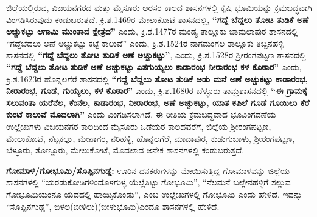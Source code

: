 ಜಿಲ್ಲೆಯಲ್ಲಿರುವ, ವಿಜಯನಗರದ ಮತ್ತು ಮೈಸೂರು ಅರಸರ ಕಾಲದ ಶಾಸನಗಳಲ್ಲಿ ಕೃಷಿ ಭೂಮಿಯನ್ನು ಕ್ರಮಬದ್ಧವಾಗಿ ವಿಂಗಡಿಸಿರುವುದು ಕಂಡುಬರುತ್ತದೆ. ಕ್ರಿ.ಶ.1469ರ ಮೇಲುಕೋಟೆ ಶಾಸನದಲ್ಲಿ, \textbf{“ಗದ್ದೆ ಬೆದ್ದಲು ತೋಟ ತುಡಿಕೆ ಅಣೆ ಅಚ್ಚುಕಟ್ಟು ಆಗಾಮಿ ಮುಂತಾದ ಕ್ಷೇತ್ರದ”} ಎಂದು, ಕ್ರಿ.ಶ.1477ರ ಮಂಡ್ಯ ತಾಲ್ಲೂಕು ಚಾಮಲಾಪುರ ಶಾಸನದಲ್ಲಿ “ಗದ್ದೆಬೆದಲು ಅಣೆ ಅಚ್ಚುಕಟ್ಟು ಕಟ್ಟೆ ಕಾಲುವೆ” ಎಂದು, ಕ್ರಿ.ಶ.1524ರ ನಾಗಮಂಗಲ ತಾಲ್ಲೂಕು ತಿಬ್ಬನಹಳ್ಳಿ ಶಾಸನದಲ್ಲಿ \textbf{“ಗದ್ದೆ ಬೆದ್ದಲು ತೋಟ ತುಡಿಕೆ ಅಣೆ ಅಚ್ಚುಕಟ್ಟು”}, ಎಂದು, ಕ್ರಿ.ಶ.1528ರ ಶ‍್ರೀರಂಗಪಟ್ಟಣ ಶಾಸನದಲ್ಲಿ \textbf{“ಗದ್ದೆ ಬೆದ್ದಲು ತೋಟ ತುಡಿಕೆ ಅಣೆ ಅಚ್ಚುಕಟ್ಟು ಏತಗುಯ್ಯಲು ಕಾಡಾರಂಭ ನೀರಾರಂಭ ಕಳ ಕೊಠಾರ”} ಎಂದು, ಕ್ರಿ.ಶ.1623ರ ಹೊನ್ನಲಗೆರೆ ಶಾಸನದಲ್ಲಿ \textbf{“ಗದ್ದೆ ಬೆದ್ದಲು ತೋಟ ತುಡಿಕೆ ಅಡು ಮನೆ ಅಣೆ ಅಚ್ಚುಕಟ್ಟು ಕಾಡಾರಂಭ, ನೀರಾರಂಭ, ಗೂಡೆ,\general{\break } ಗುಯ್ಯಲು, ಕಳ ಕೊಠಾರ”} ಎಂದು, ಕ್ರಿ.ಶ.1680ರ ಬೆಳ್ಳೂರು ತಾಮ್ರಶಾಸನದಲ್ಲಿ \textbf{“ಈ ಗ್ರಾಮಕ್ಕೆ ಸಲುವಂತಾ ಯರೆನೆಲ,\general{\break } ಕೆಂನೆಲ, ಕಾಡಾರಂಭ, ನೀರಾರಂಭ, ಅಣೆ ಅಚ್ಚುಕಟ್ಟು, ಯಾತ ಕಪಿಲೆ ಗೂಡೆ ಗೂಯಿಲು ಕೆರೆ ಕುಂಟೆ ಕಾಲುವೆ ಮೊದಲಾಗಿ”} ಎಂದು ವಿಂಗಡಿಸಲಾಗಿದೆ. ಈ ರೀತಿಯ ಕ್ರಮಬದ್ಧವಾದ ಭೂವಿಂಗಡಣೆಯ ಉಲ್ಲೇಖಗಳು ವಿಜಯನಗರ ಕಾಲದಿಂದ ಮೈಸೂರು ಒಡೆಯರ ಕಾಲದವರೆಗೆ, ಜಿಲ್ಲೆಯ ಶ‍್ರೀರಂಗಪಟ್ಟಣ, ಮೇಲುಕೋಟೆ, ನೆಟ್ಟಕಲ್ಲು, ಮೇನಾಗರ, ನರಿಹಳ್ಳಿ, ಹೊನ್ನಲಗೆರೆ, ಮಾದಾಪುರ, ಕುಡುಗುಬಾಳು, ಶ‍್ರೀರಂಗಪಟ್ಟಣ, ಬೆಳ್ಳೂರು, ತೊಣ್ಣೂರು, ಮೇಲುಕೋಟೆ, ಮೊದಲಾದ ಅನೇಕ ಶಾಸನಗಳಲ್ಲಿ ಕಂಡುಬರುತ್ತದೆ.

\textbf{ಗೋಮಾಳ/ಗೋಭೂಮಿ/ಸೊಪ್ಪಿನಗುಡ್ಡೆ:} ಊರಿನ ದನಕರುಗಳನ್ನು ಮೇಯಿಸುತ್ತಿದ್ದ ಗೋಮಾಳವನ್ನು ಜಿಲ್ಲೆಯ ಶಾಸನಗಳಲ್ಲಿ “ಯರಡುಕೋಡಿಗಳಿಂದೊಳಗುಳ್ಳ ಯೆಲ್ಲೆತಿಟ್ಟು ಗೋಭೂಮಿ”, “ನೆಲಮನೆ ಬಲ್ಲೇನಹಳ್ಳಿಗೆ ಸಲ್ಲುವ ಗೋಭೂಮಿಯಂನೂ ಯೆಡದಲ್ಲಿ ಹಾಯ್ಕಿಕೊಂಡು”, ಎಂಬ ಉಲ್ಲೇಖಗಳಲ್ಲಿ ಗೋಭೂಮಿ ಎಂದು ಹೇಳಿದೆ. ಇದನ್ನು “ಸೊಪ್ಪಿನಗುಡ್ಡೆ”, ಬಿಳಲ(ಬೀಳಿಲು)(ಬೀಳುಭೂಮಿ)ಎಂದೂ ಶಾಸನಗಳಲ್ಲಿ ಹೇಳಿದೆ.

